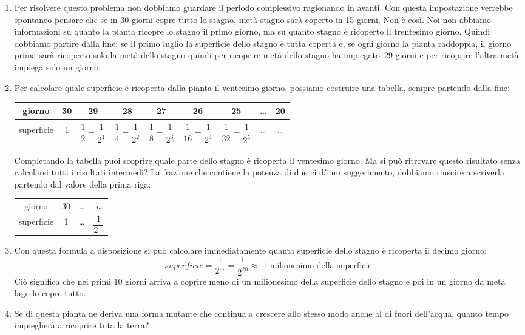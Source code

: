 \begin{enumerate}
 \item
Per risolvere questo problema non dobbiamo guardare il periodo complessivo 
ragionando in avanti. Con questa impostazione verrebbe spontaneo pensare che se 
in 30 giorni copre tutto lo stagno, metà stagno sarà coperto in 15 giorni. Non 
è così.
Noi non abbiamo informazioni su quanto la pianta ricopre lo stagno il primo 
giorno, ma su quanto stagno è ricoperto il trentesimo giorno.
Quindi dobbiamo partire dalla fine: se il primo luglio la superficie dello 
stagno è tutta coperta e, se ogni giorno la pianta raddoppia, il giorno prima 
sarà ricoperto solo la metà dello stagno quindi per ricoprire metà dello stagno 
ha impiegato~29 giorni e per ricoprire l'altra metà impiega solo un giorno.

 \item
Per calcolare quale superficie è ricoperta dalla pianta il ventesimo giorno, 
possiamo costruire una tabella, sempre partendo dalla fine:

\begin{center}
\begin{tabular}{c|c|c|c|c|c|c|c|c}
giorno & 30 & 29 & 28 & 27 & 26 & 25 & \dots & 20\\[6pt]
\hline &&&&&&&&\\ [-6pt]
superficie & 1 & \(\dfrac{1}{2}=\dfrac{1}{2^1}\) & 
 \(\dfrac{1}{4}=\dfrac{1}{2^2}\) & 
 \(\dfrac{1}{8}=\dfrac{1}{2^3}\) & 
 \(\dfrac{1}{16}=\dfrac{1}{2^4}\) & 
 \(\dfrac{1}{32}=\dfrac{1}{2^5}\) & \dots & \dots\\
\end{tabular}
\end{center}

Completando la tabella puoi scoprire quale parte dello stagno è ricoperta il 
ventesimo giorno. Ma si può ritrovare questo risultato senza calcolarsi tutti i 
risultati intermedi?
La frazione che contiene la potenza di due ci dà un suggerimento, dobbiamo 
riuscire a scriverla partendo dal valore della prima riga:

\begin{center}
\begin{tabular}{cccc}
giorno & 30 & \dots & \(n\) \\
superficie & 1 & \dots & \(\dfrac{1}{2^{\dots}}\) \\
\end{tabular}
\end{center}

 \item
Con questa formula a disposizione si può calcolare immediatamente quanta 
superficie dello stagno è ricoperta il decimo giorno:
\[superficie = \dfrac{1}{2^{\dots}} = \dfrac{1}{2^{20}} \approx 
\text{ 1 milionesimo della superficie}\]
Ciò significa che nei primi 10 giorni arriva a coprire meno di un milionesimo 
della superficie dello stagno e poi in un giorno da metà lago lo copre tutto.
 \item
Se di questa pianta ne deriva una forma mutante che continua a crescere allo 
stesso modo anche al di fuori dell'acqua, quanto tempo impiegherà a ricoprire 
tuta la terra?
\end{enumerate}

